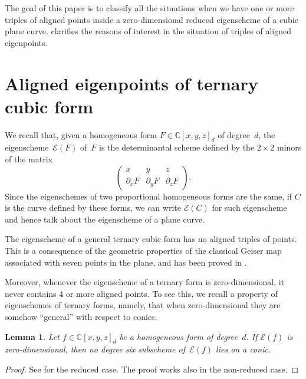 \documentclass{amsart}
\theoremstyle{plain}
\newtheorem{lemma}{Lemma}[section]
\theoremstyle{definition}
\newcommand{\C}{\mathbb{C}}
\newcommand{\de}{\partial}
\newcommand{\Eig}[1]{\mathcal{E}\!\left( {#1} \right)}
\begin{document}
The goal of this paper is to classify all the situations when we have one or more triples of aligned points inside a zero-dimensional reduced eigenscheme of a cubic plane curve.
 clarifies the reasons of interest in the situation of triples of aligned eigenpoints.





\section{Aligned eigenpoints of ternary cubic form}
\label{aligned}

We recall that, given a homogeneous form $F \in \C[x,y,z]_d$ of degree~$d$, the eigenscheme~$\Eig{F}$ of~$F$ is the determinantal scheme defined by the $2 \times 2$ minors of the matrix
%
\begin{equation}
\label{eq:def_matrix}
    \begin{pmatrix}
    x & y & z \\
    \de_x F & \de_y F & \de_z F
    \end{pmatrix}.
\end{equation}
%
Since the eigenschemes of two proportional homogeneous forms are the same,
if $C$ is the curve defined by these forms,
we can write $\Eig{C}$ for such eigenscheme and hence talk about the eigenscheme of a plane curve.

The eigenscheme of a general ternary cubic form has no aligned triples of points. This is a consequence of the geometric properties of the classical Geiser map associated with seven points in the plane, and has been proved in \cite[Proposition~4.5]{BGV}.

Moreover, whenever the eigenscheme of a ternary form is zero-dimensional, it never contains $4$ or more aligned points.
To see this, we recall a property of eigenschemes of ternary forms, namely,
that when zero-dimensional they are somehow ``general'' with respect to conics.

\begin{lemma}
\label{lemma:no_six_conic}
Let $f \in \C[x,y,z]_d$ be a homogeneous form of degree~$d$.
If $\Eig{f}$ is zero-dimensional,
then no degree six subscheme of~$\Eig{f}$ lies on a conic.
\end{lemma}
\begin{proof}
See \cite[Lemma~9.1]{OS1} for the reduced case.
The proof works also in the non-reduced case.
\end{proof}
\end{document}
